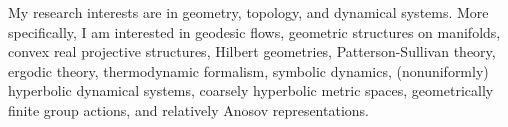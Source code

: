 
\medskip

My research interests are in geometry, topology, and dynamical systems.
More specifically, I am interested in geodesic flows, geometric structures
on manifolds, convex real projective structures, Hilbert geometries,
Patterson-Sullivan theory, ergodic theory, thermodynamic formalism,
symbolic dynamics, (nonuniformly) hyperbolic dynamical systems, coarsely
hyperbolic metric spaces, geometrically finite group actions, and
relatively Anosov representations.